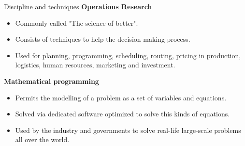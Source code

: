 \documentclass[final]{beamer}
\newlength{\onecolwid}
\newlength{\threecolwid}
\begin{document}
\begin{frame}[t]
\begin{columns}[t]
\begin{column}{\onecolwid}
\begin{block}{Discipline and techniques}
			\textbf{Operations Research}
			
			\begin{itemize}
				\item Commonly called "The science of better".
				\item Consists of techniques to help the decision making process.
				\item Used for planning, programming, scheduling, routing, pricing in production, logistics, human resources, marketing and investment.
			\end{itemize}
			
			\textbf{Mathematical programming}

			\begin{itemize}
				\item Permits the modelling of a problem as a set of variables and equations.
				\item Solved via dedicated software optimized to solve this kinds of equations.
				\item Used by the industry and governments to solve real-life large-scale problems all over the world.
			\end{itemize}

		\end{block}


	\end{column} %

\end{columns} %





\end{frame} %
\end{document}
